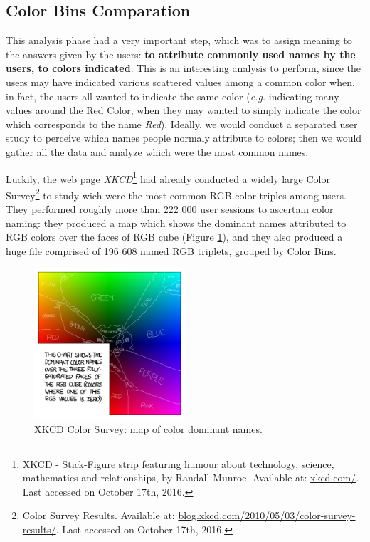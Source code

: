 \subsection{Color Bins Comparation}
\label{subsec:results_preparation}
%
This analysis phase had a very important step, which was to assign meaning to the answers given by the users: \textbf{to attribute commonly used names by the users, to colors indicated}. This is an interesting
analysis to perform, since the users may have indicated various scattered values among a common color when, in fact, the users all wanted to indicate the same color (\emph{e.g.} indicating many values around the
Red Color, when they may wanted to simply indicate the color which corresponds to the name \emph{Red}). Ideally, we would conduct a separated user study to perceive which names people normaly attribute to colors;
then we would gather all the data and analyze which were the most common names. \par
%
Luckily, the web page \emph{XKCD}\footnote{XKCD - Stick-Figure strip featuring humour about technology, science, mathematics and relationships, by Randall Munroe.
Available at: \url{xkcd.com/}. Last accessed on October 17th, 2016.} had already conducted a widely large Color Survey\footnote{Color Survey Results. Available at:
\url{blog.xkcd.com/2010/05/03/color-survey-results/}. Last accessed on October 17th, 2016.} to study wich were the most common RGB color triples among users. They performed roughly more
than 222 000 user sessions to ascertain color naming: they produced a map which shows the dominant names attributed to \gls{RGB} colors over the faces of \gls{RGB} cube (Figure \ref{fig:colornames_xkcd}),
and they also produced a huge file comprised of 196 608 named \gls{RGB} triplets, grouped by \ul{Color Bins}.
%
\begin{figure}[htbp]
	\centering
  \includegraphics[width=0.5\textwidth]{images/results/satfaces_map.png}
  \caption[XKCD Color Survey: Color Dominant Names]{XKCD Color Survey: map of color dominant names.}
  \label{fig:colornames_xkcd}
\end{figure} \par
